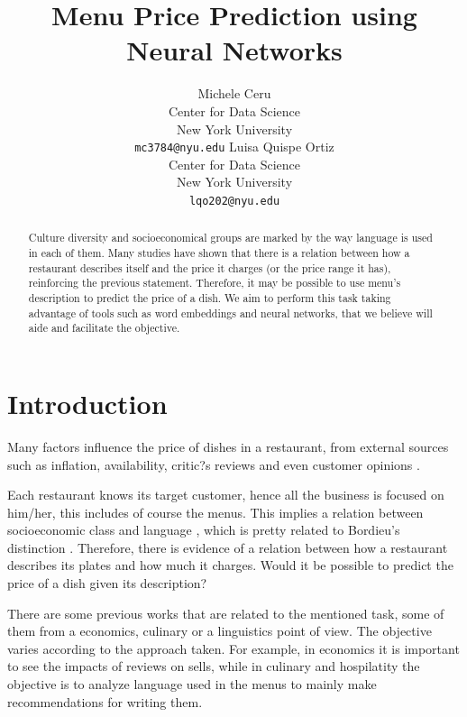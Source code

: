 \documentclass[11pt,letterpaper]{article}
\title{Menu Price Prediction using Neural Networks}
\author{Michele Ceru \\
	    Center for Data Science\\
		New York University\\
	    {\tt mc3784@nyu.edu}
	  \And
	Luisa Quispe Ortiz\\
  	Center for Data Science \\
  	New York University\\
  {\tt lqo202@nyu.edu}}
\date{}
\begin{document}
\maketitle

\begin{abstract}
Culture diversity and socioeconomical groups are marked by the way language is used in each of them.
Many studies have shown that there is a relation between how a restaurant describes itself and the price it charges (or the price range it has), reinforcing the previous statement. Therefore, it may be possible to use menu's description to predict the price of a dish. We aim  to perform this task taking advantage of tools such as word embeddings and neural networks, that we believe will aide and facilitate the objective.

\end{abstract}

\section{Introduction}


Many factors influence the price of dishes in a  restaurant, from external sources such as inflation, availability, critic?s reviews and even customer opinions \cite{jurafsky2014language}.

Each restaurant knows its target customer, hence all the business is focused on him/her, this includes of course the menus. This implies a relation between socioeconomic class and language \cite{freedman2011authenticity}, which is pretty related to  Bordieu's distinction \cite{jurafsky2016bordieu}. Therefore, there is evidence of a relation between how a restaurant describes its plates and how much it charges. Would it be possible to predict the price of a dish given its description?

There are some previous works that are related to the mentioned task, some of them from a economics, culinary or a linguistics point of view. The objective varies according to the approach taken. For example, in economics it is important to see the impacts of reviews on sells, while in culinary and hospilatity the objective is to analyze language used in the menus to mainly make recommendations for writing them\cite{chahuneau2012word}.
\end{document}
